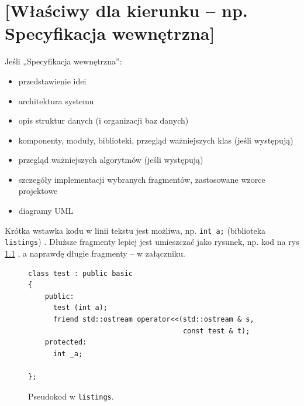 \documentclass[a4paper,twoside,12pt]{book}
\begin{document}
\chapter{[Właściwy dla kierunku -- np. Specyfikacja wewnętrzna]}
\label{ch:05}


Jeśli „Specyfikacja wewnętrzna”:
\begin{itemize}
\item przedstawienie idei
\item architektura systemu
\item opis struktur danych (i organizacji baz danych)
\item komponenty, moduły, biblioteki, przegląd ważniejszych klas (jeśli występują)
\item przegląd ważniejszych algorytmów (jeśli występują)
\item szczegóły implementacji wybranych fragmentów, zastosowane wzorce projektowe
\item diagramy UML
\end{itemize}



Krótka wstawka kodu w linii tekstu jest możliwa, np.  \lstinline|int a;| (biblioteka \texttt{listings})%
. 
Dłuższe fragmenty lepiej jest umieszczać jako rysunek, np. kod na rys \ref{fig:pseudokod:listings}%
, a naprawdę długie fragmenty – w załączniku.


\begin{figure}
\centering
\begin{lstlisting}
class test : public basic
{
    public:
      test (int a);
      friend std::ostream operator<<(std::ostream & s, 
                                     const test & t);
    protected:
      int _a;  
      
};
\end{lstlisting}
\caption{Pseudokod w \texttt{listings}.}
\label{fig:pseudokod:listings}
\end{figure}

%      
\end{document}
